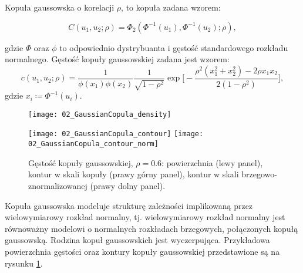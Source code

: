 \begin{df}
	Kopuła gaussowska o korelacji $\rho$, to kopuła zadana wzorem:
	
	$$ C(u_1, u_2; \rho) = \Phi_2(\Phi^{-1}(u_1), \Phi^{-1}(u_2);\rho),$$
	
	gdzie $\Phi$ oraz $\phi$ to odpowiednio dystrybuanta i gęstość standardowego rozkładu normalnego. Gęstość kopuły gaussowskiej zadana jest wzorem:
	$$ c(u_1, u_2; \rho) = \frac{1}{\phi(x_1)\phi(x_2)} \frac{1}{\sqrt{1-\rho^2}}\exp\bigg[-\frac{\rho^2(x_1^2+x_2^2) - 2\rho x_1 x_2}{2(1-\rho^2)}\bigg],$$
	gdzie $x_i\coloneqq \Phi^{-1}(u_i)$.
\end{df}
\begin{figure}[h]
	\centering
	\begin{minipage}{0.5\linewidth}
		\texttt{[image: 02\_GaussianCopula\_density]}
	\end{minipage}
	\begin{minipage}{0.45\linewidth}
		\texttt{[image: 02\_GaussianCopula\_contour]}
		\texttt{[image: 02\_GaussianCopula\_contour\_norm]}
	\end{minipage}
	\caption{Gęstość kopuły gaussowskiej, $\rho=0.6$: powierzchnia (lewy panel), kontur w skali kopuły (prawy górny panel), kontur w skali brzegowo-znormalizowanej (prawy dolny panel). \label{fig:gaussian_copula_density}}
\end{figure}

Kopuła gaussowska modeluje strukturę zależności implikowaną przez wielowymiarowy rozkład normalny, tj. wielowymiarowy rozkład normalny jest równoważny modelowi o normalnych rozkładach brzegowych, połączonych kopułą gaussowską. Rodzina kopuł gaussowskich jest wyczerpująca. Przykładowa powierzchnia gęstości oraz kontury kopuły gaussowskiej przedstawione są na rysunku \ref{fig:gaussian_copula_density}.

